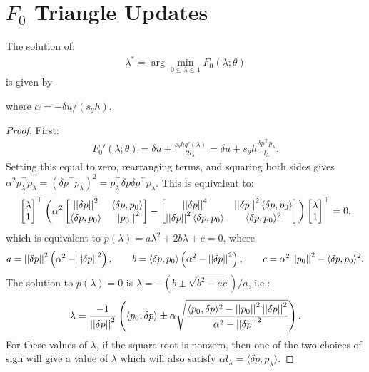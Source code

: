 \documentclass[eikonal.tex]{subfiles}
\begin{document}
\section{$F_0$ Triangle Updates}

\begin{lemma}
  The solution of:
  \begin{align*}
    \lambda^* = \arg \min_{0 \leq \lambda \leq 1} F_0(\lambda; \theta)
  \end{align*}
  is given by
  
  where $\alpha = -\delta u/(s_\theta h)$.
\end{lemma}

\begin{proof}
  First:
  \begin{align*}
    F_0'(\lambda; \theta) = \delta u + \frac{s_\theta h q'(\lambda)}{2 l_\lambda} = \delta u + s_\theta h \frac{\delta p^\top p_\lambda}{l_\lambda}.
  \end{align*}
  Setting this equal to zero, rearranging terms, and squaring both
  sides gives
  $\alpha^2 p_\lambda^\top p_\lambda = {(\delta p^\top p_\lambda)}^2 =
  p_\lambda^\top \delta p \delta p^\top p_\lambda$. This is equivalent to:
  \begin{align*}
    \begin{bmatrix} \lambda \\ 1 \end{bmatrix}^\top \left(
    \alpha^2 \begin{bmatrix}
      \left|\left|\delta p\right|\right|^2 & \langle \delta p, p_0 \rangle \\
      \langle \delta p, p_0 \rangle & \left|\left|p_0\right|\right|^2
    \end{bmatrix} - \begin{bmatrix}
      \left|\left|\delta p\right|\right|^4 & \left|\left|\delta p\right|\right|^2 \langle \delta p, p_0 \rangle \\
      \left|\left|\delta p\right|\right|^2 \langle \delta p, p_0 \rangle & \langle \delta p, p_0 \rangle^2
    \end{bmatrix}
    \right) \begin{bmatrix} \lambda \\ 1 \end{bmatrix}^\top = 0,
  \end{align*}
  which is equivalent to
  $p(\lambda) = a \lambda^2 + 2b \lambda + c = 0$, where
  \begin{align*}
    a = \left|\left|\delta p\right|\right|^2 \left(\alpha^2 - \left|\left|\delta p\right|\right|^2\right), \qquad b = \langle \delta p, p_0 \rangle \left(\alpha^2 - \left|\left|\delta p\right|\right|^2\right), \qquad c = \alpha^2 \left|\left|p_0\right|\right|^2 - \langle \delta p, p_0 \rangle^2.
  \end{align*}
  The solution to $p(\lambda) = 0$ is $\lambda = -(b \pm \sqrt{b^2 - ac})/a$, i.e.:
  \begin{align*}
    \lambda = \frac{-1}{\left|\left|\delta p\right|\right|^2} \left(\langle p_0, \delta p \rangle \pm \alpha \sqrt{\frac{\langle p_0, \delta p \rangle^2 - \left|\left|p_0\right|\right|^2 \left|\left|\delta p\right|\right|^2}{\alpha^2 - \left|\left|\delta p\right|\right|^2}}\right).
  \end{align*}
  For these values of $\lambda$, if the square root is nonzero, then
  one of the two choices of sign will give a value of $\lambda$ which
  will also satisfy
  $\alpha l_\lambda = \langle \delta p, p_\lambda \rangle$.
\end{proof}
\end{document}
